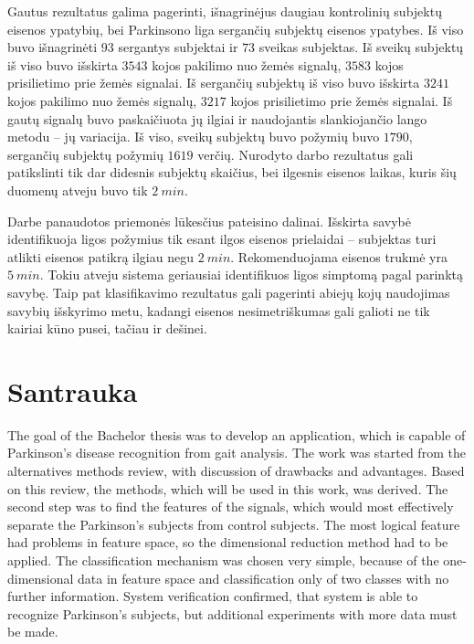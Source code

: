 \documentclass[]{vgtuef}
\begin{document}
Gautus rezultatus galima pagerinti, išnagrinėjus daugiau kontrolinių subjektų eisenos ypatybių, bei Parkinsono liga sergančių subjektų eisenos ypatybes. Iš viso buvo išnagrinėti $93$ sergantys subjektai ir $73$ sveikas subjektas. Iš sveikų subjektų iš viso buvo išskirta $3543$ kojos pakilimo nuo žemės signalų, $3583$ kojos prisilietimo prie žemės signalai. Iš sergančių subjektų iš viso buvo išskirta $3241$ kojos pakilimo nuo žemės signalų, $3217$ kojos prisilietimo prie žemės signalai. Iš gautų signalų buvo paskaičiuota jų ilgiai ir naudojantis slankiojančio lango metodu -- jų variacija. Iš viso, sveikų subjektų buvo požymių buvo $1790$, sergančių subjektų požymių $1619$ verčių. Nurodyto darbo rezultatus gali patikslinti tik dar didesnis subjektų skaičius, bei ilgesnis eisenos laikas, kuris šių duomenų atveju buvo tik $2~min$.


Darbe panaudotos priemonės lūkesčius pateisino dalinai. Išskirta savybė identifikuoja ligos požymius tik esant ilgos eisenos prielaidai -- subjektas turi atlikti eisenos patikrą ilgiau negu $2~min$. Rekomenduojama eisenos trukmė yra $5~min$. Tokiu atveju sistema geriausiai identifikuos ligos simptomą pagal parinktą savybę. Taip pat klasifikavimo rezultatus gali pagerinti abiejų kojų naudojimas savybių išskyrimo metu, kadangi eisenos nesimetriškumas gali galioti ne tik kairiai kūno pusei, tačiau ir dešinei.


\renewcommand\refname{Literatūros ir informacinių šaltinių sąrašas}




\section*{Santrauka}

The goal of the Bachelor thesis was to develop an application, which is capable of Parkinson's disease recognition from gait analysis. The work was started from the alternatives methods review, with discussion of drawbacks and advantages. Based on this review, the methods, which will be used in this work, was derived. The second step was to find the features of the signals, which would most effectively separate the Parkinson's subjects from control subjects. The most logical feature had problems in feature space, so the dimensional reduction method had to be applied. The classification mechanism was chosen very simple, because of the one-dimensional data in feature space and classification only of two classes with no further information. System verification confirmed, that system is able to recognize Parkinson's subjects, but additional experiments with more data must be made.
\end{document}
